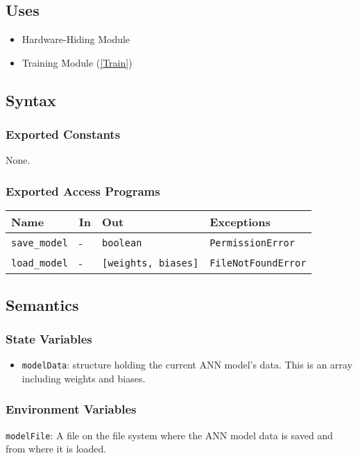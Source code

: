 \documentclass[12pt, titlepage]{article}
\def\code#1{\texttt{#1}}
\begin{document}
\subsection{Uses}
\begin{itemize}
  \item Hardware-Hiding Module  
  \item Training Module (\ref{Train})
\end{itemize}


\subsection{Syntax}

\subsubsection{Exported Constants}
None.

\subsubsection{Exported Access Programs}

\begin{center}
\begin{tabular}{p{2cm} p{4cm} p{4cm} p{3.5cm}}
\hline
\textbf{Name} & \textbf{In} & \textbf{Out} & \textbf{Exceptions} \\
\hline
\code{save\_model} & - & \code{boolean} & \code{PermissionError} \\
\code{load\_model} & - & \code{[weights, biases]} & \code{FileNotFoundError} \\
\hline
\end{tabular}
\end{center}

\subsection{Semantics}

\subsubsection{State Variables}
\begin{itemize}
  \item \code{modelData}: structure holding the current ANN model's data. 
This is an array including weights and biases.
\end{itemize}

\subsubsection{Environment Variables}
\code{modelFile}: A file on the file system where the ANN model data is saved and 
from where it is loaded.
\end{document}
